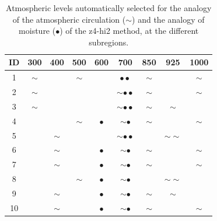 \documentclass[5p]{elsarticle}
\begin{document}
\begin{table}[htbp]
	\caption{Atmospheric levels automatically selected for the analogy of the atmospheric circulation ($\sim$) and the analogy of moisture ($\bullet$) of the z4-hi2 method, at the different subregions.}
	\footnotesize
	\begin{center}
		\begin{tabular}{ccccccccc}
			\hline ID & 300 & 400 & 500 & 600 & 700 & 850 & 925 & 1000 \\ 
			\hline 
			1  & $\sim$ &   & $\sim$ &   & $\bullet \bullet$  & $\sim$ &   & $\sim$ \\
			2  & $\sim$ &   &   &   & $\sim \bullet \bullet$ & $\sim$ &   & $\sim$ \\
			3  & $\sim$ &   &   &   & $\sim \bullet \bullet$ & $\sim$ & $\sim$ &   \\
			4  &   &   & $\sim$ & $\bullet$ & $\sim \bullet$ & $\sim$ &   & $\sim$ \\
			5  &   & $\sim$ &   &   & $\sim \bullet \bullet$ &   & $\sim \sim$ &   \\
			6  &   & $\sim$ &   & $\bullet$ & $\sim \bullet$ & $\sim$ &   & $\sim$ \\
			7  &   & $\sim$ &   & $\bullet$ & $\sim \bullet$ & $\sim$ &   & $\sim$ \\
			8  &   &   & $\sim$ & $\bullet$ & $\sim \bullet$ &   & $\sim \sim$ &   \\
			9  &   & $\sim$ &   & $\bullet$ & $\sim \bullet$ & $\sim$ & $\sim$ &   \\
			10 &   & $\sim$ &   & $\bullet$ & $\sim \bullet$ & $\sim$ &   & $\sim$ \\
			\hline 
		\end{tabular} 
	\end{center}
	\label{table:levels_GA_z4_hi2}
\end{table}
\end{document}

